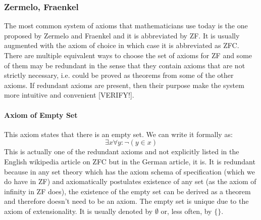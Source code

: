 \subsubsection{Zermelo, Fraenkel}
The most common system of axioms that mathematicians use today is the one proposed by Zermelo and Fraenkel and it is abbreviated by ZF. It is usually augmented with the axiom of choice in which case it is abbreviated as ZFC. There are multiple equivalent ways to choose the set of axioms for ZF and some of them may be redundant in the sense that they contain axioms that are not strictly necessary, i.e. could be proved as theorems from some of the other axioms. If redundant axioms are present, then their purpose make the system more intuitive and convenient [VERIFY!].






\paragraph{Axiom of Empty Set}
This axiom states that there is an empty set. We can write it formally as:
\begin{equation}
\exists x \forall y: \neg (y \in x)
\end{equation}
This is actually one of the redundant axioms and not explicitly listed in the English wikipedia article on ZFC but in the German article, it is. It is redundant because in any set theory which has the axiom schema of specification (which we do have in ZF) and axiomatically postulates existence of any set (as the axiom of infinity in ZF does), the existence of the empty set can be derived as a theorem and therefore doesn't need to be an axiom. The empty set is unique due to the axiom of extensionality. It is usually denoted by $\emptyset$ or, less often, by $\{ \}$.


